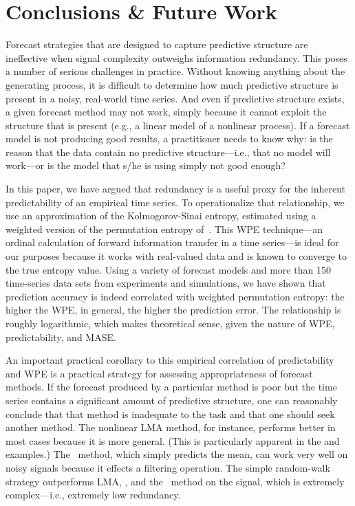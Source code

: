 \section{ Conclusions \& Future Work }\label{sec:conc}


Forecast strategies that are designed to capture predictive structure
are ineffective when signal complexity outweighs information
redundancy.  This poses a number of serious challenges in practice.
Without knowing anything about the generating process, it is difficult
to determine how much predictive structure is present in a noisy,
real-world time series.  And even if predictive structure exists, a
given forecast method may not work, simply because it cannot exploit
the structure that is present (e.g., a linear model of a nonlinear
process).  If a forecast model is not producing good results, a
practitioner needs to know why: is the reason that the data contain no
predictive structure---i.e., that no model will work---or is the model
that s/he is using simply not good enough?

In this paper, we have argued that redundancy is a useful proxy for
the inherent predictability of an empirical time series.  To
operationalize that relationship, we use an approximation of the
Kolmogorov-Sinai entropy, estimated using a weighted version of the
permutation entropy of~\cite{bandt2002per}.  This WPE technique---an
ordinal calculation of forward information transfer in a time
series---is ideal for our purposes because it works with real-valued
data and is known to converge to the true entropy value. Using a
variety of forecast models and more than 150 time-series data sets
from experiments and simulations, we have shown that prediction
accuracy is indeed correlated with weighted permutation entropy: the
higher the WPE, in general, the higher the prediction error.  The
relationship is roughly logarithmic, which makes theoretical sense,
given the nature of WPE, predictability, and MASE.

An important practical corollary to this empirical correlation of
predictability and WPE is a practical strategy for assessing
appropriateness of forecast methods.  If the forecast produced by a
particular method is poor but the time series contains a significant
amount of predictive structure, one can reasonably conclude that that
method is inadequate to the task and that one should seek another
method.  The nonlinear LMA method, for instance, performs better in
most cases because it is more general.  (This is particularly apparent
in the \col and \svdfive examples.)
The \naive ~method, which simply predicts the mean, can work very well
on noisy signals because it effects a filtering operation.  The simple
random-walk strategy outperforms LMA, \arima, and the \naive
~method on the \gcc signal, which is extremely complex---i.e.,
extremely low redundancy.


